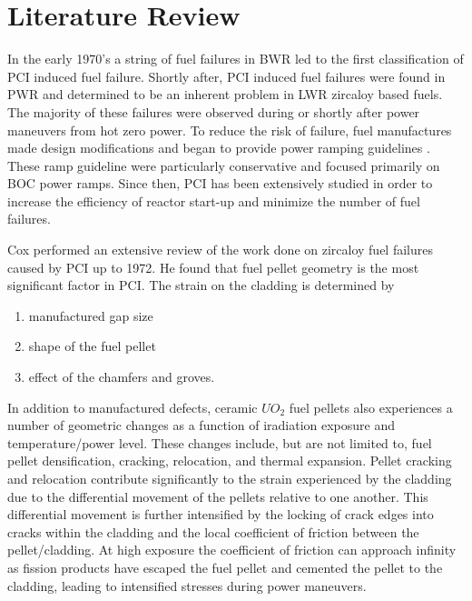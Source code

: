 \documentclass[edeposit,fullpage,11pt]{uiucthesis2009}
\begin{document}
\section{Literature Review}

In the early 1970's a string of fuel failures in \gls{BWR} led to the first classification of \gls{PCI} induced fuel failure.  
Shortly after, \gls{PCI} induced fuel failures were found in \gls{PWR} and determined to be an inherent problem in \gls{LWR} zircaloy based fuels. %
The majority of these failures were observed during or shortly after power maneuvers from hot zero power.
To reduce the risk of failure, fuel manufactures made design modifications and began to provide power ramping guidelines \cite{kennard_pci_2016}.
These ramp guideline were particularly conservative and focused primarily on \gls{BOC} power ramps. 
Since then, \gls{PCI} has been extensively studied in order to increase the efficiency of reactor start-up and minimize the number of fuel failures.
 
Cox \cite{cox_pellet-clad_1990} performed an extensive review of the work done on zircaloy fuel failures caused by \gls{PCI} up to 1972.
He found that fuel pellet geometry is the most significant factor in \gls{PCI}.
The strain on the cladding is determined by
\begin{enumerate}
\item manufactured gap size
\item shape of the fuel pellet
\item effect of the chamfers and groves.
\end{enumerate} 
In addition to manufactured defects, ceramic $UO_2$ fuel pellets also experiences a number of geometric changes as a function of iradiation exposure and temperature/power level.
These changes include, but are not limited to, fuel pellet  densification, cracking, relocation, and thermal expansion. 
Pellet cracking and relocation contribute significantly to the strain experienced by the cladding due to the differential movement of the pellets relative to one another.
This differential movement is further intensified  by the locking of crack edges into cracks within the cladding and the local coefficient of friction between the pellet/cladding.
At high exposure the coefficient of friction can approach infinity as fission products have escaped the fuel pellet and cemented the pellet to the cladding, leading to intensified stresses during power maneuvers. 
\end{document}
